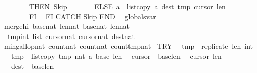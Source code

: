 \begin{isabellebody}
\ \ \ \ \ \ \ THEN\ Skip\isanewline
\ \ \ \ \ \ \ ELSE\ {\isasymacute}a\ {\isacharcolon}{\isacharequal}{\isacharequal}\ list{\isacharunderscore}copy\ {\isasymacute}a\ {\isasymacute}dest\ {\isasymacute}tmp\ {\isasymacute}cursor{}\ {\isasymacute}len{}\ \isanewline
\ \ \ \ \ \ \ FI\isanewline
\ \ FI\isanewline
CATCH\isanewline
Skip\isanewline
END\isanewline
{\isachardoublequoteclose}\isanewline
{}\isamarkupfalse%
\ {\isacharparenleft}\ globals{\isacharunderscore}var{\isacharparenright}\isanewline
merge{\isacharunderscore}hi\ {\isacharparenleft}base{}{\isacharcolon}{\isacharcolon}nat{\isacharcomma}\ len{}{\isacharcolon}{\isacharcolon}nat{\isacharcomma}\ base{}{\isacharcolon}{\isacharcolon}nat{\isacharcomma}\ len{}{\isacharcolon}{\isacharcolon}nat{\isacharparenright}\isanewline
{}\ tmp{\isacharcolon}{\isacharcolon}{\isachardoublequoteopen}int\ list{\isachardoublequoteclose}\ cursor{}{\isacharcolon}{\isacharcolon}nat\ cursor{}{\isacharcolon}{\isacharcolon}nat\ dest{\isacharcolon}{\isacharcolon}nat\ \isanewline
min{\isacharunderscore}gallop{\isacharcolon}{\isacharcolon}nat\ count{}{\isacharcolon}{\isacharcolon}nat\ count{}{\isacharcolon}{\isacharcolon}nat\ count{\isacharunderscore}tmp{\isacharcolon}{\isacharcolon}nat\ \isanewline
{\isachardoublequoteopen}\isanewline
TRY\isanewline
\ \ {\isasymacute}tmp\ {\isacharcolon}{\isacharequal}{\isacharequal}\ replicate\ {\isasymacute}len{}\ {\isacharparenleft}{}{\isacharcolon}{\isacharcolon}int{\isacharparenright}{\isacharsemicolon}{\isacharsemicolon}\isanewline
\ \ {\isasymacute}tmp\ {\isacharcolon}{\isacharequal}{\isacharequal}\ list{\isacharunderscore}copy\ {\isasymacute}tmp\ {\isacharparenleft}{}{\isacharcolon}{\isacharcolon}nat{\isacharparenright}\ {\isasymacute}a\ {\isasymacute}base{}\ {\isasymacute}len{}{\isacharsemicolon}{\isacharsemicolon}\isanewline
\ \ {\isasymacute}cursor{}\ {\isacharcolon}{\isacharequal}{\isacharequal}\ {\isasymacute}base{}{\isacharplus}{\isasymacute}len{}{\isacharminus}{}{\isacharsemicolon}{\isacharsemicolon}\isanewline
\ \ {\isasymacute}cursor{}\ {\isacharcolon}{\isacharequal}{\isacharequal}{\isasymacute}len{}{\isacharminus}{}{\isacharsemicolon}{\isacharsemicolon}\isanewline
\ \ {\isasymacute}dest\ {\isacharcolon}{\isacharequal}{\isacharequal}\ {\isasymacute}base{}{\isacharplus}{\isasymacute}len{}{\isacharminus}{}{\isacharsemicolon}{\isacharsemicolon}\isanewline

\end{isabellebody}
